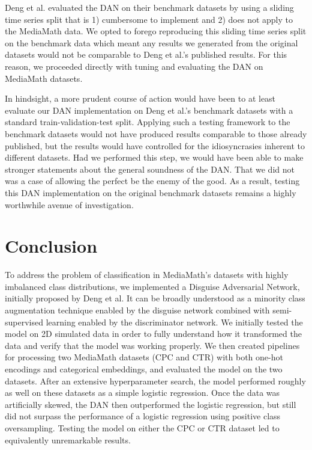\documentclass{proc}
\begin{document}
Deng et al. evaluated the DAN on their benchmark datasets by using a sliding time series split that is 1) cumbersome to implement and 2) does not apply to the MediaMath data. We opted to forego reproducing this sliding time series split on the benchmark data which meant any results we generated from the original datasets would not be comparable to Deng et al.'s published results. For this reason, we proceeded directly with tuning and evaluating the DAN on MediaMath datasets.

In hindsight, a more prudent course of action would have been to at least evaluate our DAN implementation on Deng et al.'s benchmark datasets with a standard train-validation-test split. Applying such a testing framework to the benchmark datasets would not have produced results comparable to those already published, but the results would have controlled for the idiosyncrasies inherent to different datasets. Had we performed this step, we would have been able to make stronger statements about the general soundness of the DAN. That we did not was a case of allowing the perfect be the enemy of the good. As a result, testing this DAN implementation on the original benchmark datasets remains a highly worthwhile avenue of investigation.

\section{Conclusion}

To address the problem of classification in MediaMath's datasets with highly imbalanced class distributions, we implemented a Disguise Adversarial Network, initially proposed by Deng et al. It can be broadly understood as a minority class augmentation technique enabled by the disguise network combined with semi-supervised learning enabled by the discriminator network. We initially tested the model on 2D simulated data in order to fully understand how it transformed the data and verify that the model was working properly. We then created pipelines for processing two MediaMath datasets (CPC and CTR) with both one-hot encodings and categorical embeddings, and evaluated the model on the two datasets.  After an extensive hyperparameter search, the model performed roughly as well on these datasets as a simple logistic regression. Once the data was artificially skewed, the DAN then outperformed the logistic regression, but still did not surpass the performance of a logistic regression using positive class oversampling. Testing the model on either the CPC or CTR dataset led to equivalently unremarkable results. 
\end{document}
